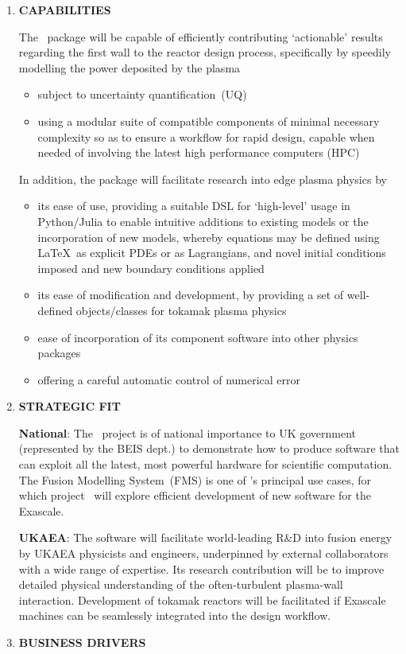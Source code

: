 \begin{enumerate}
\item  {\bf CAPABILITIES}

The \nep \ package will be capable of efficiently contributing `actionable' results regarding
the first wall to the reactor design process, specifically by speedily modelling the power deposited by the plasma
\begin{itemize}
\item subject to uncertainty quantification~(UQ)
\item using a modular suite of compatible components of minimal necessary complexity 
so as to ensure a workflow for rapid design,
capable when needed of involving the latest high performance computers (HPC)
\end{itemize}
In addition, the package will facilitate  research into edge plasma physics by
\begin{itemize}
\item its ease of use, providing a suitable DSL for `high-level' usage in Python/Julia to enable
intuitive additions to existing models or the incorporation of new models, whereby
equations may be defined using \LaTeX \ as explicit PDEs or as Lagrangians, %
and novel initial conditions imposed and new boundary conditions applied
\item its ease of modification and development, by
providing a set of well-defined objects/classes for tokamak plasma physics
\item ease of incorporation of its component software into other physics packages
\item offering a careful automatic control of numerical error
\end{itemize}

\item  {\bf STRATEGIC FIT} %

{\bf National}: The \exc \ project is of national importance to UK government
(represented by the BEIS dept.)  to demonstrate
how to produce software that can exploit all the latest, most powerful hardware
for scientific computation.  The Fusion Modelling System~(FMS) is one
of \exc 's principal use cases, for which project \nep \ will explore efficient development of
new software for the Exascale.

{\bf UKAEA}: The software will facilitate world-leading R\&D into fusion energy by UKAEA physicists and
engineers, underpinned by external collaborators with a wide range of expertise.
Its research contribution will be to improve detailed physical understanding
of the often-turbulent plasma-wall interaction. Development of tokamak reactors will
be facilitated if Exascale machines can be seamlessly integrated into the design workflow.
\item  {\bf BUSINESS DRIVERS} %


\end{enumerate}
